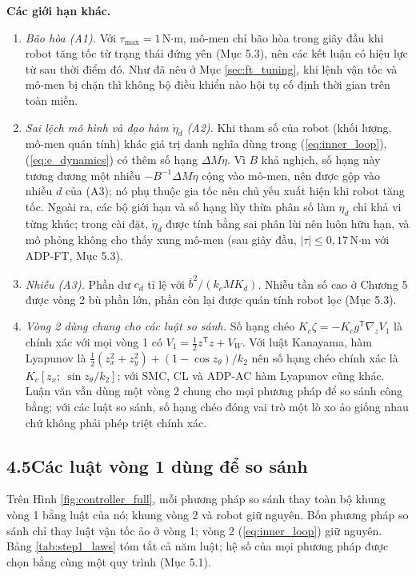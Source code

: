 \documentclass[12pt,a4paper]{article}
\makeatletter
\newcommand{\seclabel}[2]{\phantomsection\protected@edef\@currentlabel{#2}\label{#1}}
\newcommand{\T}{\mathsf{T}}
\makeatother
\begin{document}
\textbf{Các giới hạn khác.}
\begin{enumerate}
    \item \textit{Bão hòa (A1).} Với $\tau_{\max} = 1$\,N$\cdot$m, mô-men chỉ bão hòa trong giây đầu khi robot tăng tốc từ trạng thái đứng yên (Mục 5.3), nên các kết luận có hiệu lực từ sau thời điểm đó. Như đã nêu ở Mục \ref{sec:ft_tuning}, khi lệnh vận tốc và mô-men bị chặn thì không bộ điều khiển nào hội tụ cố định thời gian trên toàn miền.
    \item \textit{Sai lệch mô hình và đạo hàm $\dot\eta_d$ (A2).} Khi tham số của robot (khối lượng, mô-men quán tính) khác giá trị danh nghĩa dùng trong (\ref{eq:inner_loop}), (\ref{eq:e_dynamics}) có thêm số hạng $\Delta M\dot\eta$. Vì $B$ khả nghịch, số hạng này tương đương một nhiễu $-B^{-1}\Delta M\dot\eta$ cộng vào mô-men, nên được gộp vào nhiễu $d$ của (A3); nó phụ thuộc gia tốc nên chủ yếu xuất hiện khi robot tăng tốc. Ngoài ra, các bộ giới hạn và số hạng lũy thừa phân số làm $\eta_d$ chỉ khả vi từng khúc; trong cài đặt, $\dot\eta_d$ được tính bằng sai phân lùi nên luôn hữu hạn, và mô phỏng không cho thấy xung mô-men (sau giây đầu, $|\tau| \leq 0{,}17$\,N$\cdot$m với ADP-FT, Mục 5.3).
    \item \textit{Nhiễu (A3).} Phần dư $c_d$ tỉ lệ với $\bar b^2/(k_cMK_d)$. Nhiễu tần số cao ở Chương 5 được vòng 2 bù phần lớn, phần còn lại được quán tính robot lọc (Mục 5.3).
    \item \textit{Vòng 2 dùng chung cho các luật so sánh.} Số hạng chéo $K_c\zeta = -K_c g^\T\nabla_z V_1$ là chính xác với mọi vòng 1 có $V_1 = \frac12 z^\T z + V_W$. Với luật Kanayama, hàm Lyapunov là $\frac12(z_x^2 + z_y^2) + (1-\cos z_\theta)/k_2$ nên số hạng chéo chính xác là $K_c[z_x;\ \sin z_\theta/k_2]$; với SMC, CL và ADP-AC hàm Lyapunov cũng khác. Luận văn vẫn dùng một vòng 2 chung cho mọi phương pháp để so sánh công bằng; với các luật so sánh, số hạng chéo đóng vai trò một lò xo ảo giống nhau chứ không phải phép triệt chính xác.
\end{enumerate}

\subsection*{4.5\quad Các luật vòng 1 dùng để so sánh}
\seclabel{sec:baselines}{4.5}

Trên Hình \ref{fig:controller_full}, mỗi phương pháp so sánh thay toàn bộ khung vòng 1 bằng luật của nó; khung vòng 2 và robot giữ nguyên. Bốn phương pháp so sánh chỉ thay luật vận tốc ảo ở vòng 1; vòng 2 (\ref{eq:inner_loop}) giữ nguyên. Bảng \ref{tab:step1_laws} tóm tắt cả năm luật; hệ số của mọi phương pháp được chọn bằng cùng một quy trình (Mục 5.1).
\end{document}
